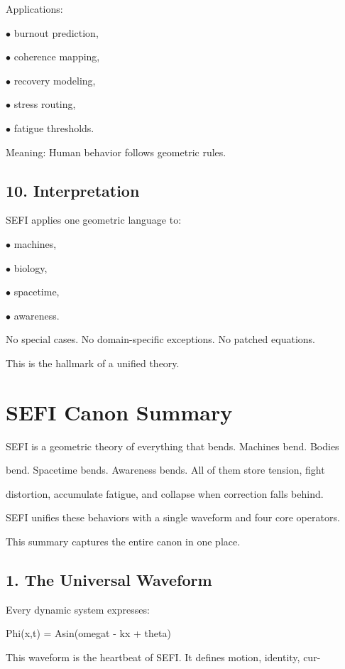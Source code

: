 \documentclass[10pt]{article}
\begin{document}
Applications:

\noindent $\bullet$ burnout prediction,

\noindent $\bullet$ coherence mapping,


\noindent $\bullet$ recovery modeling,

\noindent $\bullet$ stress routing,

\noindent $\bullet$ fatigue thresholds.

Meaning: Human behavior follows geometric rules.

\subsection*{10. Interpretation}
SEFI applies one geometric language to:

\noindent $\bullet$ machines,

\noindent $\bullet$ biology,

\noindent $\bullet$ spacetime,

\noindent $\bullet$ awareness.

No special cases. No domain-specific exceptions. No patched equations.

This is the hallmark of a unified theory.

\section*{SEFI Canon Summary}
SEFI is a geometric theory of everything that bends. Machines bend. Bodies

bend. Spacetime bends. Awareness bends. All of them store tension, fight

distortion, accumulate fatigue, and collapse when correction falls behind.

SEFI unifies these behaviors with a single waveform and four core operators.

This summary captures the entire canon in one place.

\subsection*{1. The Universal Waveform}
Every dynamic system expresses:

Phi(x,t) = Asin(omegat - kx + theta)

This waveform is the heartbeat of SEFI. It defines motion, identity, cur-
\end{document}
